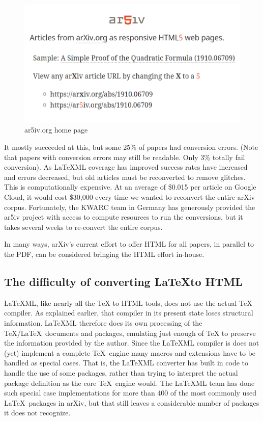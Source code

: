 \documentclass{easychair}
\begin{document}
\begin{figure}[H]
    \centering
    \includegraphics[width=1.0\linewidth]{ar5iv.png}
    \caption{ar5iv.org home page}
    \label{fig:enter-label}
\end{figure}

It mostly succeeded at this, but some 25\% of papers had conversion errors. (Note that papers with conversion errors may still be readable. Only 3\% totally fail conversion). As LaTeXML coverage has improved success rates have increased and errors decreased, but old articles must be reconverted to remove glitches. This is computationally expensive. At an average of \$0.015 per article on Google Cloud, it would cost \$30,000 every time we wanted to reconvert the entire arXiv corpus. Fortunately, the KWARC team in Germany has generously provided the ar5iv project with access to compute resources to run the conversions, but it takes several weeks to re-convert the entire corpus.

In many ways, arXiv's current effort to offer HTML for all papers, in parallel to the PDF, can be considered bringing the HTML effort in-house.

\subsection{The difficulty of converting \LaTeX to HTML}
\label{sect:The difficulty of converting LaTeX to HTML}

LaTeXML, like nearly all the TeX to HTML tools, does not use the actual TeX compiler. As explained earlier, that compiler in its present state loses structural information. LaTeXML therefore does its own processing of the \TeX/\LaTeX\ documents and packages, emulating just enough of TeX to preserve the information provided by the author. Since the LaTeXML compiler is does not (yet) implement a complete \TeX\ engine many macros and extensions have to be handled as special cases. That is, the LaTeXML converter has built in code to handle the use of some packages, rather than trying to interpret the actual package definition as the core \TeX\ engine would. The LaTeXML team has done such special case implementations for more than 400 of the most commonly used \LaTeX\ packages in arXiv, but that still leaves a considerable number of packages it does not recognize.
\end{document}

